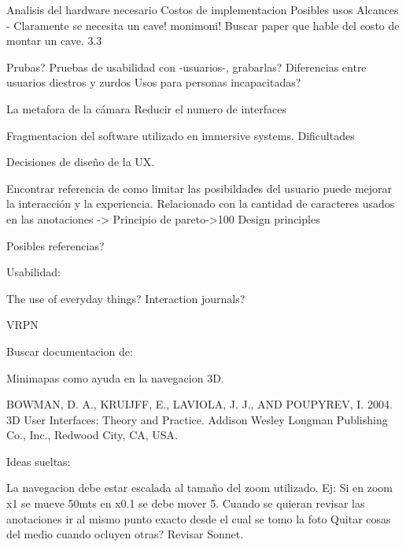 Analisis del hardware necesario
Costos de implementacion
Posibles usos
Alcances - Claramente se necesita un cave! monimoni!
Buscar paper que hable del costo de montar un cave. 3.3


Prubas?
Pruebas de usabilidad con -usuarios-, grabarlas? 
Diferencias entre usuarios diestros y zurdos
Usos para personas incapacitadas?

La metafora de la cámara
Reducir el numero de interfaces

Fragmentacion del software utilizado en immersive systems.
Dificultades

Decisiones de diseño de la UX.

Encontrar referencia de como limitar las posibildades del usuario puede mejorar la interacción y la experiencia. Relacionado con la cantidad de caracteres usados en las anotaciones -> Principio de pareto->100 Design principles

Posibles referencias?

Usabilidad:

	The use of everyday things?
	Interaction journals?

VRPN




Buscar documentacion de:

Minimapas como ayuda en la navegacion 3D.

BOWMAN, D. A., KRUIJFF, E., LAVIOLA, J. J., AND POUPYREV, I. 2004. 3D User Interfaces: Theory and Practice. Addison Wesley Longman Publishing Co., Inc., Redwood City, CA, USA.

Ideas sueltas:

	La navegacion debe estar escalada al tamaño del zoom utilizado. Ej: Si en zoom x1 se mueve 50mts en x0.1 se debe mover 5.
	Cuando se quieran revisar las anotaciones ir al mismo punto exacto desde el cual se tomo la foto
	Quitar cosas del medio cuando ocluyen otras? Revisar Sonnet.